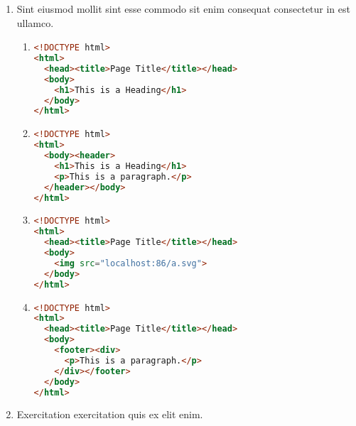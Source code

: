 \documentclass[a4paper,12pt]{article}
\begin{document}
\begin{enumerate}[label=\textbf{\arabic*.}]
\begin{enumerate}
  \end{enumerate}
  \item Sint eiusmod mollit sint esse commodo sit enim consequat consectetur in est ullamco.
  \begin{enumerate}
    \item \hfill \vspace*{-7mm}
    \begin{lstlisting}[language=HTML]
<!DOCTYPE html>
<html>
  <head><title>Page Title</title></head>
  <body>
    <h1>This is a Heading</h1>
  </body>
</html>
    \end{lstlisting}
    \item \hfill \vspace*{-7mm}
    \begin{lstlisting}[language=HTML]
<!DOCTYPE html> 
<html>
  <body><header>
    <h1>This is a Heading</h1>
    <p>This is a paragraph.</p>
  </header></body>
</html>
    \end{lstlisting}
    \item \hfill \vspace*{-7mm}
    \begin{lstlisting}[language=HTML]
<!DOCTYPE html>
<html>
  <head><title>Page Title</title></head>
  <body>
    <img src="localhost:86/a.svg">
  </body>
</html>
    \end{lstlisting}
    \item \hfill \vspace*{-7mm}
    \begin{lstlisting}[language=HTML]
<!DOCTYPE html>
<html>
  <head><title>Page Title</title></head>
  <body>
    <footer><div>
      <p>This is a paragraph.</p>
    </div></footer>
  </body>
</html>
    \end{lstlisting}
  \end{enumerate}
  \item Exercitation exercitation quis ex elit enim.
  

\end{enumerate}
\end{document}
